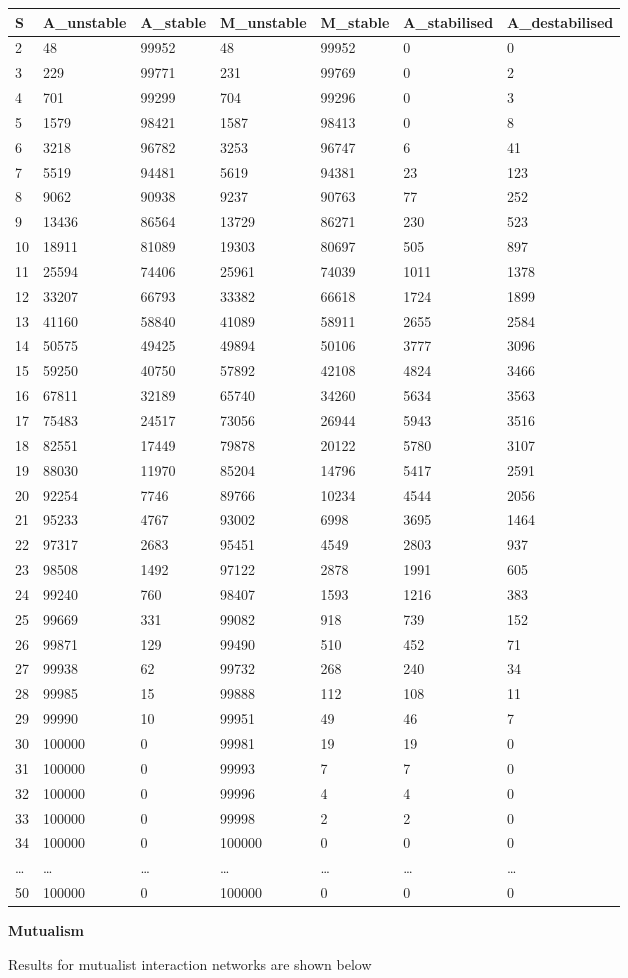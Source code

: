 \documentclass[]{article}
\begin{document}
\begin{longtable}[]{@{}lllllll@{}}
\toprule
S & A\_unstable & A\_stable & M\_unstable & M\_stable & A\_stabilised &
A\_destabilised\tabularnewline
\midrule
\endhead
2 & 48 & 99952 & 48 & 99952 & 0 & 0\tabularnewline
3 & 229 & 99771 & 231 & 99769 & 0 & 2\tabularnewline
4 & 701 & 99299 & 704 & 99296 & 0 & 3\tabularnewline
5 & 1579 & 98421 & 1587 & 98413 & 0 & 8\tabularnewline
6 & 3218 & 96782 & 3253 & 96747 & 6 & 41\tabularnewline
7 & 5519 & 94481 & 5619 & 94381 & 23 & 123\tabularnewline
8 & 9062 & 90938 & 9237 & 90763 & 77 & 252\tabularnewline
9 & 13436 & 86564 & 13729 & 86271 & 230 & 523\tabularnewline
10 & 18911 & 81089 & 19303 & 80697 & 505 & 897\tabularnewline
11 & 25594 & 74406 & 25961 & 74039 & 1011 & 1378\tabularnewline
12 & 33207 & 66793 & 33382 & 66618 & 1724 & 1899\tabularnewline
13 & 41160 & 58840 & 41089 & 58911 & 2655 & 2584\tabularnewline
14 & 50575 & 49425 & 49894 & 50106 & 3777 & 3096\tabularnewline
15 & 59250 & 40750 & 57892 & 42108 & 4824 & 3466\tabularnewline
16 & 67811 & 32189 & 65740 & 34260 & 5634 & 3563\tabularnewline
17 & 75483 & 24517 & 73056 & 26944 & 5943 & 3516\tabularnewline
18 & 82551 & 17449 & 79878 & 20122 & 5780 & 3107\tabularnewline
19 & 88030 & 11970 & 85204 & 14796 & 5417 & 2591\tabularnewline
20 & 92254 & 7746 & 89766 & 10234 & 4544 & 2056\tabularnewline
21 & 95233 & 4767 & 93002 & 6998 & 3695 & 1464\tabularnewline
22 & 97317 & 2683 & 95451 & 4549 & 2803 & 937\tabularnewline
23 & 98508 & 1492 & 97122 & 2878 & 1991 & 605\tabularnewline
24 & 99240 & 760 & 98407 & 1593 & 1216 & 383\tabularnewline
25 & 99669 & 331 & 99082 & 918 & 739 & 152\tabularnewline
26 & 99871 & 129 & 99490 & 510 & 452 & 71\tabularnewline
27 & 99938 & 62 & 99732 & 268 & 240 & 34\tabularnewline
28 & 99985 & 15 & 99888 & 112 & 108 & 11\tabularnewline
29 & 99990 & 10 & 99951 & 49 & 46 & 7\tabularnewline
30 & 100000 & 0 & 99981 & 19 & 19 & 0\tabularnewline
31 & 100000 & 0 & 99993 & 7 & 7 & 0\tabularnewline
32 & 100000 & 0 & 99996 & 4 & 4 & 0\tabularnewline
33 & 100000 & 0 & 99998 & 2 & 2 & 0\tabularnewline
34 & 100000 & 0 & 100000 & 0 & 0 & 0\tabularnewline
\ldots{} & \ldots{} & \ldots{} & \ldots{} & \ldots{} & \ldots{} &
\ldots{}\tabularnewline
50 & 100000 & 0 & 100000 & 0 & 0 & 0\tabularnewline
\bottomrule
\end{longtable}

\textbf{Mutualism}

Results for mutualist interaction networks are shown below
\end{document}
